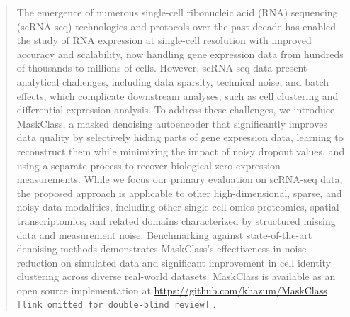 \documentclass{article}
\theoremstyle{plain}
\theoremstyle{definition}
\theoremstyle{remark}
\newcommand{\maskclassrepolink}{%
  \ificmlshowauthors%
    \href{https://github.com/khazum/MaskClass}{https://github.com/khazum/MaskClass}%
  \else%
    \texttt{[link omitted for double-blind review]}%
  \fi%
}
\begin{document}
\begin{NoHyper}
\printAffiliationsAndNotice{}  %
\end{NoHyper}

\begin{abstract}
The emergence of numerous single-cell ribonucleic acid (RNA) sequencing (scRNA-seq) technologies and protocols over the past decade has enabled the study of RNA expression at single-cell resolution with improved accuracy and scalability, now handling gene expression data from hundreds of thousands to millions of cells. However, scRNA-seq data present analytical challenges, including data sparsity, technical noise, and batch effects, which complicate downstream analyses, such as cell clustering and differential expression analysis. To address these challenges, we introduce MaskClass, a masked denoising autoencoder that significantly improves data quality by selectively hiding parts of gene expression data, learning to reconstruct them while minimizing the impact of noisy dropout values, and using a separate process to recover biological zero-expression measurements. While we focus our primary evaluation on scRNA-seq data, the proposed approach is applicable to other high-dimensional, sparse, and noisy data modalities, including other single-cell omics proteomics, spatial transcriptomics, and related domains characterized by structured missing data and measurement noise. Benchmarking against state-of-the-art denoising methods demonstrates MaskClass's effectiveness in noise reduction on simulated data and significant improvement in cell identity clustering across diverse real-world datasets. MaskClass is available as an open source implementation at \maskclassrepolink.
\end{abstract}
\end{document}
